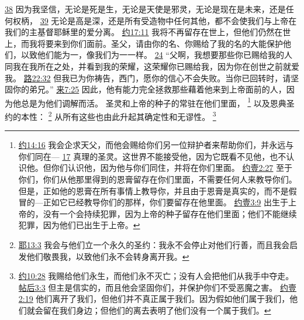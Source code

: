 \documentclass[12pt, a4paper, oneside]{ctexart}
\begin{document}
{		\href{https://biblehub.com/romans/8-38.htm}{38} 因为我坚信，无论是死是生，无论是天使是邪灵，无论是现在是未来，还是任何权柄，
		\href{https://biblehub.com/romans/8-39.htm}{39} 无论是高是深，还是所有受造物中任何其他，都不会使我们与上帝在我们的主基督耶稣里的爱分离。
		\href{https://biblehub.com/john/17-11.htm}{约17:11} 我将不再留存在世上，但他们仍然在世上，而我将要来到你们面前。圣父，请由你的名、你赐给了我的名的大能保护他们，以致他们能为一，像我们为一一样。
		\href{https://biblehub.com/john/17-24.htm}{24} “父啊，我想要那些你已赐给我的人同我在我所在之处，并看到我的荣耀，这荣耀你已赐给我，因为你在创世之前就爱我。
		\href{https://biblehub.com/luke/22-32.htm}{路22:32} 但我已为你祷告，西门，愿你的信心不会失败。当你已回转时，请坚固你的弟兄。”
		\href{https://biblehub.com/hebrews/7-25.htm}{来7:25} 因此，他有能力完全拯救那些藉着他来到上帝面前的人，因为他总是为他们调解而活。
	}
	圣灵和上帝的种子的常驻在他们里面，
	\footnote {
		\href{https://biblehub.com/john/14-16.htm}{约14:16} 我会企求天父，而他会赐给你们另一位辩护者来帮助你们，并永远与你们同在---
		\href{https://biblehub.com/john/14-17.htm}{17} 真理的圣灵。这世界不能接受他，因为它既看不见他，也不认识他。但你们认识他，因为他与你们同住，并将在你们里面。
		\href{https://biblehub.com/1_john/2-27.htm}{约壹2:27} 至于你们，你们从他那里得到的恩膏留存在你们里面，不需要任何人来教导你们。但是，正如他的恩膏在所有事情上教导你，并且由于恩膏是真实的，而不是假冒的---正如它已经教导你们的那样，你们要留存在他里面。
		\href{https://biblehub.com/1_john/3-9.htm}{约壹3:9} 出生于上帝的，没有一个会持续犯罪，因为上帝的种子留存在他们里面；他们不能继续犯罪，因为他们已出生于上帝。
	}
	以及恩典圣约的本性：
	\footnote {
		\href{https://biblehub.com/jeremiah/32-40.htm}{耶13:3} 我会与他们立一个永久的圣约：我永不会停止对他们行善，而且我会启发他们敬畏我，以致他们永不会转身离开我。
	}
	从所有这些也由此升起其确定性和无谬性。
	\footnote {
		\href{https://biblehub.com/john/10-28.htm}{约10:28} 我赐给他们永生，而他们永不灭亡；没有人会把他们从我手中夺走。
		\href{https://biblehub.com/2_thessalonians/3-3.htm}{帖后3:3} 但主是信实的，而且他会坚固你们，并保护你们不受恶魔之害。
		\href{https://biblehub.com/1_john/2-19.htm}{约壹2:19} 他们离开了我们，但他们并不真正属于我们。因为假如他们属于我们，他们就会留在我们身边；但他们的离去表明了他们没有一个属于我们。
	}
\end{document}

